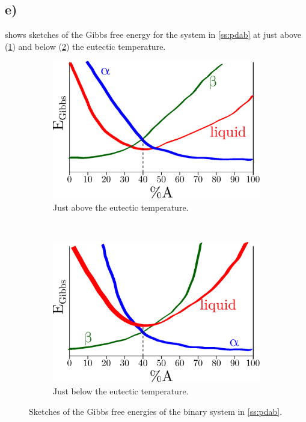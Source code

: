 \documentclass[a4paper]{article}
\begin{document}
	\subsection{e)}
	 shows sketches of the Gibbs free energy for the system in \cref{ss:pdab} at just above (\cref{sf:abht}) and below (\cref{sf:ablt}) the eutectic temperature.
	\begin{figure}[t!]
		\centering
		\begin{subfigure}[t]{0.45\linewidth}
			\centering
			\includegraphics[width=\linewidth]{abht.eps}
			\caption{Just above the eutectic temperature.}
			\label{sf:abht}
		\end{subfigure}
		~
		\begin{subfigure}[t]{0.45\linewidth}
			\centering
			\includegraphics[width=\linewidth]{ablt.eps}
			\caption{Just below the eutectic temperature.}
			\label{sf:ablt}
		\end{subfigure}
		\caption{Sketches of the Gibbs free energies of the binary system in \cref{ss:pdab}.}
		\label{f:abe}
	\end{figure}
\end{document}
